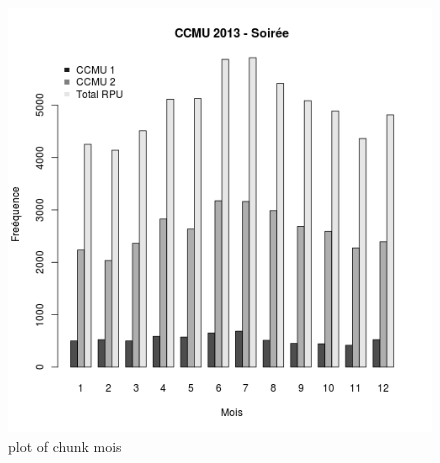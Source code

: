 \begin{figure}[htbp]
\centering
\includegraphics{figure/mois1.png}
\caption{plot of chunk mois}
\end{figure}

\begin{Shaded}
\begin{Highlighting}[]

 \NormalTok{, } \NormalTok{(}\NormalTok{, }\NormalTok{), } \NormalTok{)}
 \NormalTok{(}\NormalTok{, }\NormalTok{), } \NormalTok{)}
\end{Highlighting}
\end{Shaded}

